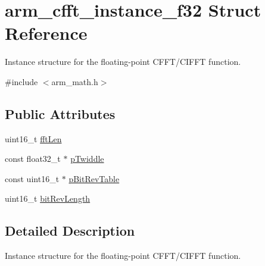 \hypertarget{structarm__cfft__instance__f32}{\section{arm\-\_\-cfft\-\_\-instance\-\_\-f32 Struct Reference}
\label{structarm__cfft__instance__f32}
}


Instance structure for the floating-\/point C\-F\-F\-T/\-C\-I\-F\-F\-T function.  




{\ttfamily \#include $<$arm\-\_\-math.\-h$>$}

\subsection*{Public Attributes}
\begin{DoxyCompactItemize}
\item 
uint16\-\_\-t \hyperlink{structarm__cfft__instance__f32_acd8f9e9540e3dd348212726e5d6aaa95}{fft\-Len}
\item 
const float32\-\_\-t $\ast$ \hyperlink{structarm__cfft__instance__f32_a59cc6f753f1498716e1444ac054c06de}{p\-Twiddle}
\item 
const uint16\-\_\-t $\ast$ \hyperlink{structarm__cfft__instance__f32_a21ceaf59a1bb8440af57c28d2dd9bbab}{p\-Bit\-Rev\-Table}
\item 
uint16\-\_\-t \hyperlink{structarm__cfft__instance__f32_a3ba329ed153d182746376208e773d648}{bit\-Rev\-Length}
\end{DoxyCompactItemize}


\subsection{Detailed Description}
Instance structure for the floating-\/point C\-F\-F\-T/\-C\-I\-F\-F\-T function. 

